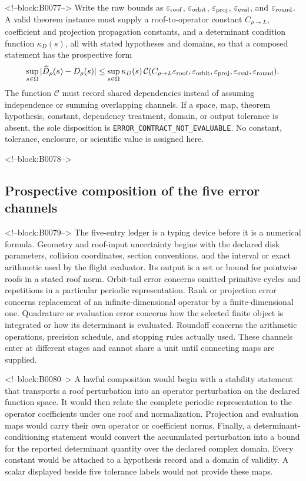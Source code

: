 \documentclass[11pt,a4paper]{article}
\begin{document}
<!--block:B0077-->
Write the raw bounds as \(\varepsilon_{\rm roof}\), \(\varepsilon_{\rm orbit}\), \(\varepsilon_{\rm proj}\), \(\varepsilon_{\rm eval}\), and \(\varepsilon_{\rm round}\). A valid theorem instance must supply a roof-to-operator constant \(C_{\rho\to L}\), coefficient and projection propagation constants, and a determinant condition function \(\kappa_D(s)\), all with stated hypotheses and domains, so that a composed statement has the prospective form
\[
 \sup_{s\in\Omega}|\widehat D_\rho(s)-D_\rho(s)|\leq\sup_{s\in\Omega}\kappa_D(s)\,\mathcal{C}(C_{\rho\to L}\varepsilon_{\rm roof},\varepsilon_{\rm orbit},\varepsilon_{\rm proj},\varepsilon_{\rm eval},\varepsilon_{\rm round}).
\]
The function \(\mathcal{C}\) must record shared dependencies instead of assuming independence or summing overlapping channels. If a space, map, theorem hypothesis, constant, dependency treatment, domain, or output tolerance is absent, the sole disposition is \texttt{ERROR\_CONTRACT\_NOT\_EVALUABLE}. No constant, tolerance, enclosure, or scientific value is assigned here.

<!--block:B0078-->
\subsection{Prospective composition of the five error channels}

<!--block:B0079-->
The five-entry ledger is a typing device before it is a numerical formula. Geometry and roof-input uncertainty begins with the declared disk parameters, collision coordinates, section conventions, and the interval or exact arithmetic used by the flight evaluator. Its output is a set or bound for pointwise roofs in a stated roof norm. Orbit-tail error concerns omitted primitive cycles and repetitions in a particular periodic representation. Rank or projection error concerns replacement of an infinite-dimensional operator by a finite-dimensional one. Quadrature or evaluation error concerns how the selected finite object is integrated or how its determinant is evaluated. Roundoff concerns the arithmetic operations, precision schedule, and stopping rules actually used. These channels enter at different stages and cannot share a unit until connecting maps are supplied.

<!--block:B0080-->
A lawful composition would begin with a stability statement that transports a roof perturbation into an operator perturbation on the declared function space. It would then relate the complete periodic representation to the operator coefficients under one roof and normalization. Projection and evaluation maps would carry their own operator or coefficient norms. Finally, a determinant-conditioning statement would convert the accumulated perturbation into a bound for the reported determinant quantity over the declared complex domain. Every constant would be attached to a hypothesis record and a domain of validity. A scalar displayed beside five tolerance labels would not provide these maps.
\end{document}

